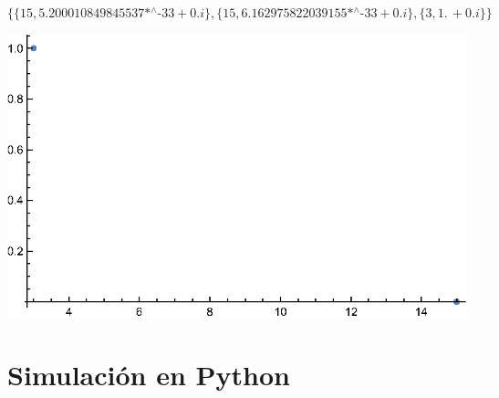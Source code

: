 \begin{doublespace}
\noindent\(\{\{15,\text{5.200010849845537$\grave{ }$*${}^{\wedge}$-33}+0. i\},\{15,\text{6.162975822039155$\grave{ }$*${}^{\wedge}$-33}+0. i\},\{3,1.\,
+0. i\}\}\)
\end{doublespace}

\includegraphics{img/Shor_gr4.eps}


\section{Simulación en Python}


